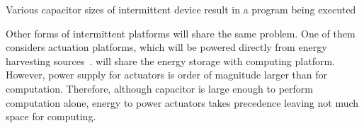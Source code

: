 Various capacitor sizes of intermittent device result in a program being executed 

Other forms of intermittent platforms will share the same problem. One of them considers actuation platforms, which will be powered directly from energy harvesting sources~\cite{}. will share the energy storage with computing platform. However, power supply for actuators is order of magnitude larger than for computation. Therefore, although capacitor is large enough to perform computation alone, energy to power actuators takes precedence leaving not much space for computing.


